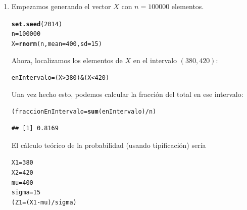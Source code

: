 \documentclass[10pt,a4paper]{article}\usepackage[]{graphicx}\usepackage[]{color}
\makeatletter
\newcommand{\hlnum}[1]{\textcolor[rgb]{0.686,0.059,0.569}{#1}}%
\newcommand{\hlopt}[1]{\textcolor[rgb]{0,0,0}{#1}}%
\newcommand{\hlstd}[1]{\textcolor[rgb]{0.345,0.345,0.345}{#1}}%
\newcommand{\hlkwb}[1]{\textcolor[rgb]{0.69,0.353,0.396}{#1}}%
\newcommand{\hlkwc}[1]{\textcolor[rgb]{0.333,0.667,0.333}{#1}}%
\newcommand{\hlkwd}[1]{\textcolor[rgb]{0.737,0.353,0.396}{\textbf{#1}}}%
\newenvironment{kframe}{%
 \def\at@end@of@kframe{}%
 \ifinner\ifhmode%
  \def\at@end@of@kframe{\end{minipage}}%
  \begin{minipage}{\columnwidth}%
 \fi\fi%
 \def\FrameCommand##1{\hskip\@totalleftmargin \hskip-\fboxsep
 \colorbox{shadecolor}{##1}\hskip-\fboxsep
     \hskip-\linewidth \hskip-\@totalleftmargin \hskip\columnwidth}%
 \MakeFramed {\advance\hsize-\width
   \@totalleftmargin\z@ \linewidth\hsize
   \@setminipage}}%
 {\par\unskip\endMakeFramed%
 \at@end@of@kframe}
\newenvironment{knitrout}{}{} %
\makeatother
\begin{document}
\begin{enumerate}
  \item Empezamos generando el vector $X$ con $n=100000$ elementos.
\begin{knitrout}
\color{fgcolor}\begin{kframe}
\begin{alltt}
  \hlkwd{set.seed}\hlstd{(}\hlnum{2014}\hlstd{)}
  \hlstd{n} \hlkwb{=} \hlnum{100000}
  \hlstd{X} \hlkwb{=} \hlkwd{rnorm}\hlstd{(n,} \hlkwc{mean}\hlstd{=}\hlnum{400}\hlstd{,} \hlkwc{sd}\hlstd{=}\hlnum{15}\hlstd{)}
\end{alltt}
\end{kframe}
\end{knitrout}
        Ahora, localizamos los elementos de $X$ en el intervalo $(380, 420)$:
\begin{knitrout}
\color{fgcolor}\begin{kframe}
\begin{alltt}
  \hlstd{enIntervalo} \hlkwb{=} \hlstd{(X} \hlopt{>} \hlnum{380}\hlstd{)} \hlopt{&} \hlstd{(X} \hlopt{<} \hlnum{420}\hlstd{)}
\end{alltt}
\end{kframe}
\end{knitrout}
        Una vez hecho esto, podemos calcular la fracción del total en ese intervalo:
\begin{knitrout}
\color{fgcolor}\begin{kframe}
\begin{alltt}
  \hlstd{(fraccionEnIntervalo} \hlkwb{=} \hlkwd{sum}\hlstd{(enIntervalo)} \hlopt{/} \hlstd{n)}
\end{alltt}
\begin{verbatim}
## [1] 0.8169
\end{verbatim}
\end{kframe}
\end{knitrout}
        El cálculo teórico de la probabilidad (usando tipificación) sería
\begin{knitrout}
\color{fgcolor}\begin{kframe}
\begin{alltt}
  \hlstd{X1} \hlkwb{=} \hlnum{380}
  \hlstd{X2} \hlkwb{=} \hlnum{420}
  \hlstd{mu} \hlkwb{=} \hlnum{400}
  \hlstd{sigma} \hlkwb{=} \hlnum{15}
  \hlstd{(Z1} \hlkwb{=} \hlstd{(X1} \hlopt{-} \hlstd{mu)} \hlopt{/} \hlstd{sigma)}
\end{alltt}

\end{kframe}
\end{knitrout}
\end{enumerate}
\end{document}
